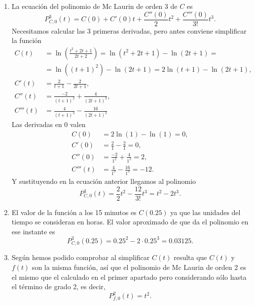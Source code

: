 {\begin{enumerate}
\item La ecuación del polinomio de Mc Laurin de orden 3 de $C$ es 
\begin{equation}
P_{C,0}^3(t) = C(0)+ C'(0)t + \frac{C''(0)}{2}t^2 + \frac{C'''(0)}{3!}t^3.
\end{equation}
Necesitamos calcular las 3 primeras derivadas, pero antes conviene simplificar la función 
\begin{align*}
C(t)&= \ln\left(\frac{t^2+2t+1}{2t+2}\right)= \ln(t^2+2t+1)-\ln(2t+1) =\\
&= \ln((t+1)^2) -\ln(2t+1) = 2\ln(t+1)-\ln(2t+1),\\
C'(t)&= \frac{2}{t+1}-\frac{2}{2t+1},\\
C''(t)&= \frac{-2}{(t+1)^2}+\frac{4}{(2t+1)^2},\\
C'''(t)&= \frac{4}{(t+1)^3}-\frac{16}{(2t+1)^3}
\end{align*}
Las derivadas en 0 valen
\begin{align*}
C(0)&=  2\ln(1)-\ln(1) = 0,\\
C'(0)&= \frac{2}{1}-\frac{2}{1}= 0,\\
C''(0)&= \frac{-2}{1^2}+\frac{4}{1^2} = 2,\\
C'''(t)&= \frac{4}{1^3}-\frac{16}{1^3} = -12.
\end{align*}
Y sustituyendo en la ecuación anterior llegamos al polinomio 
\[
P_{C,0}^3(t) = \frac{2}{2}t^2 - \frac{12}{3!}t^3 = t^2-2t^3.
\]

\item El valor de la función a los 15 minutos es $C(0.25)$ ya que las unidades del tiempo se consideran en horas. El valor aproximado de que da el polinomio en ese instante es
\[
P_{C,0}^3(0.25) = 0.25^2-2\cdot 0.25^3 = 0.03125.
\]

\item Según hemos podido comprobar al simplificar $C(t)$ resulta que $C(t)$ y $f(t)$ son la misma función, así que el polinomio de Mc Laurin de orden 2 es el mismo que el calculado en el primer apartado pero considerando sólo hasta el término de grado 2, es decir,
\[
P_{f,0}^2(t) = t^2.
\]
\end{enumerate}
}


